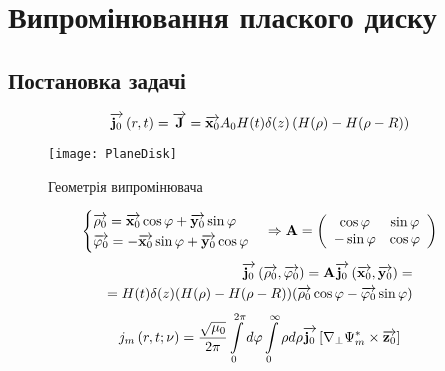 \chapter{Випромінювання плаского диску}
\label{ch:pdisk}

\section{Постановка задачі}
%
\begin{equation}
\overrightarrow{\mathbf j_0} \left( r, t \right) = \overrightarrow{\mathbf J} = \overrightarrow{\mathbf x_0} A_0 H(t) \delta(z) 
\left(  H(\rho) - H(\rho - R) \right)
\end{equation}
%
\begin{figure}[htbp] \begin{center}
\texttt{[image: PlaneDisk]}
\caption{Геометрія випромінювача} \label{fig:pdisk}
\end{center} \end{figure}
%
\textcolor{lightgray} { \begin{equation*} \begin{aligned}
\begin{cases}
\overrightarrow{\mathbf \rho_0} = \overrightarrow{\mathbf x_0} \cos \varphi + \overrightarrow{\mathbf y_0} \sin \varphi \\
\overrightarrow{\mathbf \varphi_0} = - \overrightarrow{\mathbf x_0} \sin \varphi + \overrightarrow{\mathbf y_0} \cos \varphi
\end{cases} \Rightarrow \mathbf{A} = \left( \begin{array}{cc}
\cos \varphi & \sin \varphi \\
- \sin \varphi & \cos \varphi
\end{array} \right)
\end{aligned} \end{equation*} }
%
\textcolor{lightgray} { \begin{equation*} \begin{aligned}
\overrightarrow{\mathbf j_0} \left( \overrightarrow{\mathbf \rho_0}, \overrightarrow{\mathbf \varphi_0} \right) = 
\mathbf{A} \overrightarrow{\mathbf j_0} \left( \overrightarrow{\mathbf x_0}, \overrightarrow{\mathbf y_0} \right) = \\
= H(t) \delta(z) (  H(\rho) - H(\rho - R) ) 
( \overrightarrow{\mathbf \rho_0} \cos \varphi - \overrightarrow{\mathbf \varphi_0} \sin \varphi )
\end{aligned} \end{equation*} }
%
\begin{equation}
j_m \left( r, t; \nu \right) = \frac{\sqrt{\mu_0}}{2\pi} 
\int \limits_{0}^{2\pi} d \varphi \int \limits_{0}^{\infty} \rho d \rho 
\overrightarrow{\mathbf j_0} \left[  \nabla_\perp \Psi_m^*  \times  \overrightarrow{\mathbf z_0}  \right]
\end{equation}
